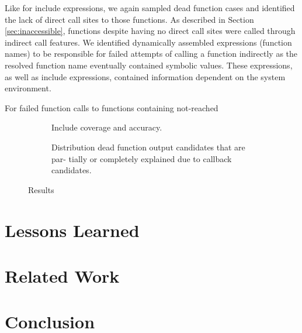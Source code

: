 \documentclass[sigconf]{acmart}
\begin{document}
Like for include expressions, we again sampled dead function cases and
identified the lack of direct call sites to those functions. As described in
Section \ref{sec:inaccessible}, functions despite having no direct call sites
were called through indirect call features. We identified dynamically assembled
expressions (function names) to be responsible for failed attempts of calling a
function indirectly as the resolved function name eventually contained symbolic
values. These expressions, as well as include expressions, contained
information dependent on the system environment.

For failed function calls to functions containing not-reached
	
	
\begin{figure}[h!]
	\begin{subfigure}[center]{0.48\textwidth}
		
		\caption{\label{coverage}}
	\end{subfigure}
	
	\begin{subfigure}[center]{0.48\textwidth}
		
		\caption{
			Include coverage and accuracy.
			\label{fig:include_coverage_results}
		}
	\end{subfigure}
	
	
	\begin{subfigure}[center]{0.48\textwidth}
		
		\caption{
			Distribution dead function output candidates that are par-
			tially or completely explained due to callback candidates.
			\label{fig:output_candidate_explanation}
		}
		
	\end{subfigure}
	\caption{Results}
\end{figure}

\section{Lessons Learned}
\textcolor{blue}{\Blindtext}


\section{Related Work} \label{sec:related_work}
\cite{Hills:2013:ESP:2483760.2483786}
\cite{wassermann2007sound,minamide2005static}
\textcolor{blue}{\blindtext\blindtext}

\section{Conclusion}

\newpage

 
\end{document}
